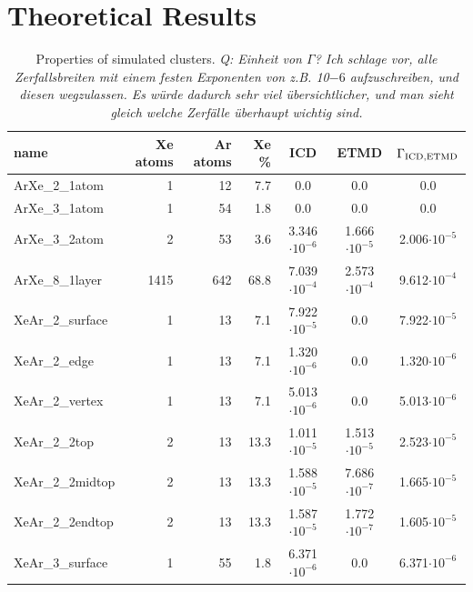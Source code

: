 \section{Theoretical Results}
%
%
\begin{table}[h]
\centering
\caption{Properties of simulated clusters.
{\it Q: Einheit von $\Gamma$? 
Ich schlage vor, alle Zerfallsbreiten mit einem festen Exponenten von z.B. 10${-6}$ aufzuschreiben, und diesen wegzulassen. 
Es w\"urde dadurch sehr viel \"ubersichtlicher, und man sieht gleich welche Zerf\"alle \"uberhaupt wichtig sind.}
}
\begin{tabular}{lrrrccc}
\toprule
name                 & Xe atoms & Ar atoms & Xe \% &   ICD                &  ETMD                & $\Gamma_{\rm ICD,ETMD}$\\
\midrule
ArXe\_2\_1atom       &      1   &     12   &  7.7  &      0.0             &  0.0                 &     0.0            \\
ArXe\_3\_1atom       &      1   &     54   &  1.8  &      0.0             &  0.0                 &     0.0            \\ 
ArXe\_3\_2atom       &      2   &     53   &  3.6  & 3.346$\cdot 10^{-6}$ & 1.666$\cdot 10^{-5}$ & 2.006$\cdot 10^{-5}$ \\
ArXe\_8\_1layer      &   1415   &    642   & 68.8  & 7.039$\cdot 10^{-4}$ & 2.573$\cdot 10^{-4}$ & 9.612$\cdot 10^{-4}$ \\
\midrule
XeAr\_2\_surface     &      1   &     13   &  7.1  & 7.922$\cdot 10^{-5}$ & 0.0                  & 7.922$\cdot 10^{-5}$ \\
XeAr\_2\_edge        &      1   &     13   &  7.1  & 1.320$\cdot 10^{-6}$ & 0.0                  & 1.320$\cdot 10^{-6}$ \\
XeAr\_2\_vertex      &      1   &     13   &  7.1  & 5.013$\cdot 10^{-6}$ & 0.0                  & 5.013$\cdot 10^{-6}$ \\
XeAr\_2\_2top        &      2   &     13   & 13.3  & 1.011$\cdot 10^{-5}$ & 1.513$\cdot 10^{-5}$ & 2.523$\cdot 10^{-5}$ \\
XeAr\_2\_2midtop     &      2   &     13   & 13.3  & 1.588$\cdot 10^{-5}$ & 7.686$\cdot 10^{-7}$ & 1.665$\cdot 10^{-5}$ \\
XeAr\_2\_2endtop     &      2   &     13   & 13.3  & 1.587$\cdot 10^{-5}$ & 1.772$\cdot 10^{-7}$ & 1.605$\cdot 10^{-5}$ \\
XeAr\_3\_surface     &      1   &     55   &  1.8  & 6.371$\cdot 10^{-6}$ & 0.0                  & 6.371$\cdot 10^{-6}$ \\

\end{tabular}
\end{table}

